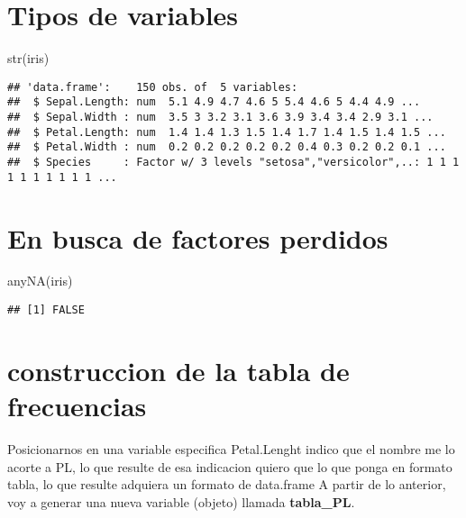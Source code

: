 \documentclass[
]{article}
\newenvironment{Shaded}{\begin{snugshade}}{\end{snugshade}}
\newcommand{\FunctionTok}[1]{\textcolor[rgb]{0.00,0.00,0.00}{#1}}
\newcommand{\NormalTok}[1]{#1}
\begin{document}
\hypertarget{tipos-de-variables}{%
\section{Tipos de variables}\label{tipos-de-variables}}

\begin{Shaded}
\begin{Highlighting}[]
\FunctionTok{str}\NormalTok{(iris) }
\end{Highlighting}
\end{Shaded}

\begin{verbatim}
## 'data.frame':    150 obs. of  5 variables:
##  $ Sepal.Length: num  5.1 4.9 4.7 4.6 5 5.4 4.6 5 4.4 4.9 ...
##  $ Sepal.Width : num  3.5 3 3.2 3.1 3.6 3.9 3.4 3.4 2.9 3.1 ...
##  $ Petal.Length: num  1.4 1.4 1.3 1.5 1.4 1.7 1.4 1.5 1.4 1.5 ...
##  $ Petal.Width : num  0.2 0.2 0.2 0.2 0.2 0.4 0.3 0.2 0.2 0.1 ...
##  $ Species     : Factor w/ 3 levels "setosa","versicolor",..: 1 1 1 1 1 1 1 1 1 1 ...
\end{verbatim}

\hypertarget{en-busca-de-factores-perdidos}{%
\section{En busca de factores
perdidos}\label{en-busca-de-factores-perdidos}}

\begin{Shaded}
\begin{Highlighting}[]
\FunctionTok{anyNA}\NormalTok{(iris) }
\end{Highlighting}
\end{Shaded}

\begin{verbatim}
## [1] FALSE
\end{verbatim}

\hypertarget{construccion-de-la-tabla-de-frecuencias}{%
\section{construccion de la tabla de
frecuencias}\label{construccion-de-la-tabla-de-frecuencias}}

Posicionarnos en una variable especifica Petal.Lenght indico que el
nombre me lo acorte a PL, lo que resulte de esa indicacion quiero que lo
que ponga en formato tabla, lo que resulte adquiera un formato de
data.frame A partir de lo anterior, voy a generar una nueva variable
(objeto) llamada \textbf{tabla\_PL}.
\end{document}
